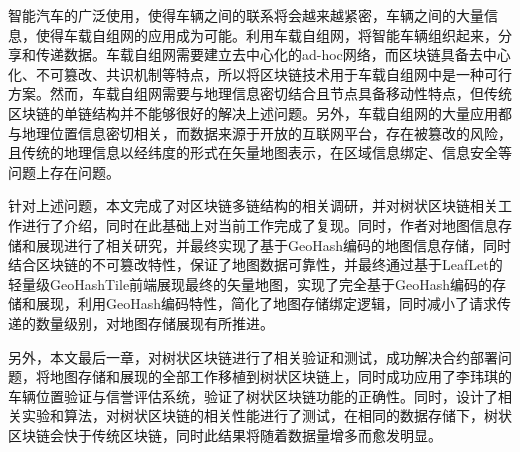 %
%
%
%
%
%

\renewcommand{\thechapter}{结论}


智能汽车的广泛使用，使得车辆之间的联系将会越来越紧密，车辆之间的大量信息，使得车载自组网的应用成为可能。利用车载自组网，将智能车辆组织起来，分享和传递数据。车载自组网需要建立去中心化的ad-hoc网络，而区块链具备去中心化、不可篡改、共识机制等特点，所以将区块链技术用于车载自组网中是一种可行方案。然而，车载自组网需要与地理信息密切结合且节点具备移动性特点，但传统区块链的单链结构并不能够很好的解决上述问题。另外，车载自组网的大量应用都与地理位置信息密切相关，而数据来源于开放的互联网平台，存在被篡改的风险，且传统的地理信息以经纬度的形式在矢量地图表示，在区域信息绑定、信息安全等问题上存在问题。

针对上述问题，本文完成了对区块链多链结构的相关调研，并对树状区块链相关工作进行了介绍，同时在此基础上对当前工作完成了复现。同时，作者对地图信息存储和展现进行了相关研究，并最终实现了基于GeoHash编码的地图信息存储，同时结合区块链的不可篡改特性，保证了地图数据可靠性，并最终通过基于LeafLet的轻量级GeoHashTile前端展现最终的矢量地图，实现了完全基于GeoHash编码的存储和展现，利用GeoHash编码特性，简化了地图存储绑定逻辑，同时减小了请求传递的数量级别，对地图存储展现有所推进。

另外，本文最后一章，对树状区块链进行了相关验证和测试，成功解决合约部署问题，将地图存储和展现的全部工作移植到树状区块链上，同时成功应用了李玮琪的车辆位置验证与信誉评估系统，验证了树状区块链功能的正确性。同时，设计了相关实验和算法，对树状区块链的相关性能进行了测试，在相同的数据存储下，树状区块链会快于传统区块链，同时此结果将随着数据量增多而愈发明显。